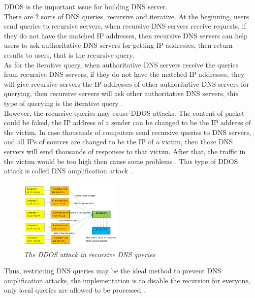 \documentclass[conference]{IEEEtran}
\begin{document}
DDOS is the important issue for building DNS server.
\\

There are 2 sorts of DNS queries, recursive and iterative. At the beginning, users send queries to recursive servers, when recursive DNS servers receive requests, if they do not have the matched IP addresses, then recursive DNS servers can help users to ask authoritative DNS servers for getting IP addresses, then return results to users, that is the recursive query. 
\\

As for the iterative query, when authoritative DNS servers receive the queries from recursive DNS servers, if they do not have the matched IP addresses, they will give recursive servers the IP addresses of other authoritative DNS servers for querying, then recursive servers will ask other authoritative DNS servers, this type of querying is the iterative query \cite{What_is_recursive_DNS}.
\\

However, the recursive queries may cause DDOS attacks. The content of packet could be faked, the IP address of a sender can be changed to be the IP address of the victim. In case thousands of computers send recursive queries to DNS servers, and all IPs of sources are changed to be the IP of a victim, then those DNS servers will send thousands of responses to that victim. After that, the traffic in the victim would be too high then cause some problems  \cite{Why_recursive_dns_not_recommended_video}. This type of DDOS attack is called DNS amplification attack \cite{DNS_amplification}.
\\

\begin{figure}[hbt!]  
    \centering
    \includegraphics[width=0.45\textwidth]{figure/recursive-query-ddos.jpg}
    \caption{\em The DDOS attack in recursive DNS queries \cite{Why_recursive_dns_not_recommended_video} \label{fig:DDOS_attack}}
\end{figure}

Thus, restricting DNS queries may be the ideal method to prevent DNS amplification attacks, the implementation is to disable the recursion for everyone, only local queries are allowed to be processed \cite{Why_recursive_dns_not_recommended_web}.
\\
\end{document}
